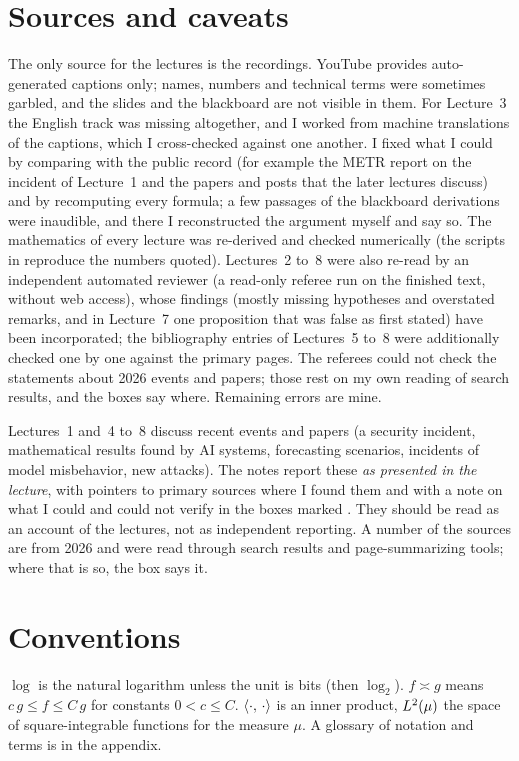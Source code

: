 \section*{Sources and caveats}
The only source for the lectures is the recordings. YouTube provides auto-generated captions only; names, numbers and technical terms were
sometimes garbled, and the slides and the blackboard are not visible in them. For Lecture~3 the English track was missing altogether, and I worked from machine translations of the captions, which I cross-checked
against one another. I fixed what I could by comparing with the public record (for example the METR report on the incident of Lecture~1 and the papers and posts that the later lectures discuss)
and by recomputing every formula; a few passages of the blackboard derivations were inaudible, and there I reconstructed
the argument myself and say so. The mathematics of every lecture was re-derived and checked numerically (the scripts in  reproduce the numbers quoted). Lectures~2 to~8 were also re-read by an independent automated reviewer (a read-only referee run on the finished text, without web access), whose findings (mostly missing hypotheses and overstated remarks, and in Lecture~7 one proposition that was false as first stated) have been incorporated; the bibliography entries of Lectures~5 to~8 were additionally checked one by one against the primary pages. The referees could not check the statements about 2026 events and papers; those rest on my own reading of search results, and the boxes say where. Remaining errors are mine.

Lectures~1 and~4 to~8 discuss recent events and papers (a security incident, mathematical results found by AI systems, forecasting scenarios, incidents of model misbehavior, new attacks). The notes report
these \emph{as presented in the lecture}, with pointers to primary sources where I found them and with a note on what I could and could not verify in the boxes marked \dagmark. They should be read as an account of the lectures,
not as independent reporting. A number of the sources are from 2026 and were read through search results and page-summarizing tools; where that is so, the box says it.


\section*{Conventions}
$\log$ is the natural logarithm unless the unit is bits (then $\log_2$). $f\asymp g$ means $c\,g\le f\le C\,g$ for constants $0<c\le C$.
$\left\langle \cdot,\,\cdot\right\rangle$ is an inner product, $L^2(\mu)$ the space of square-integrable functions for the measure $\mu$. A glossary of notation and
terms is in the appendix.

